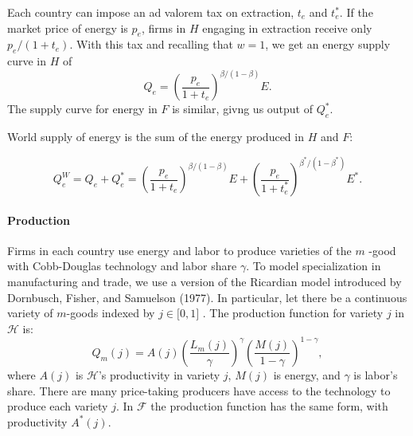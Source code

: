 \documentclass[notitlepage,12pt]{article}
\begin{document}
Each country can impose an ad valorem tax on extraction, $t_{e}$ and $%
t_{e}^{\ast }$. If the market price of energy is $p_{e}$, firms in $H$
engaging in extraction receive only $p_{e}/\left( 1+t_{e}\right) $. With
this tax and recalling that $w=1$, we get an energy supply curve in $H$ of 
\begin{equation*}
Q_{e}=\left( \frac{p_{e}}{1+t_{e}}\right) ^{\beta /(1-\beta )}E.
\end{equation*}%
The supply curve for energy in $F$ is similar, givng us output of $%
Q_{e}^{\ast }.$

World supply of energy is the sum of the energy produced in $H$ and $F$:

\begin{equation}
Q_{e}^{W}=Q_{e}+Q_{e}^{\ast }=\left( \frac{p_{e}}{1+t_{e}}\right) ^{\beta
/(1-\beta )}E+\left( \frac{p_{e}}{1+t_{e}^{\ast }}\right) ^{\beta ^{\ast
}/(1-\beta ^{\ast })}E^{\ast }.  \label{Global supply of energy}
\end{equation}

\paragraph{Production}

Firms in each country use energy and labor to produce varieties of the $m$%
-good with Cobb-Douglas technology and labor share $\gamma $. To model
specialization in manufacturing and trade, we use a version of the Ricardian
model introduced by Dornbusch, Fisher, and Samuelson (1977). In particular,
let there be a continuous variety of $m$-goods indexed by $j\in \lbrack 0,1]$%
. The production function for variety $j$ in $\mathcal{H}$ is:%
\begin{equation*}
Q_{m}(j)=A\left( j\right) \left( \frac{L_{m}(j)}{\gamma }\right) ^{\gamma
}\left( \frac{M(j)}{1-\gamma }\right) ^{1-\gamma },
\end{equation*}%
where $A(j)$ is $\mathcal{H}$'s productivity in variety $j$, $M\left(
j\right) $ is energy, and $\gamma $ is labor's share. There are many
price-taking producers have access to the technology to produce each variety 
$j$. In $\mathcal{F}$ the production function has the same form, with
productivity $A^{\ast }(j)$.
\end{document}
